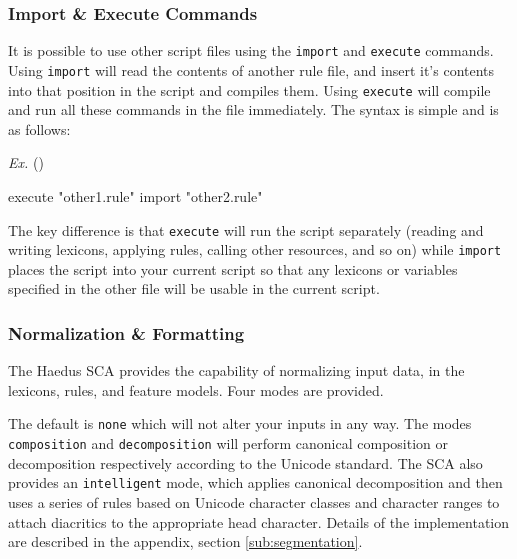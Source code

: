 \documentclass[10pt,letterpaper]{article}
\newcounter{excounter}
\newenvironment{vex}[1]{
	\refstepcounter{excounter}
	\noindent\emph{Ex.} (\arabic{excounter}\label{#1})
	\verbatim
}{\endverbatim}
\begin{document}

\subsubsection{Import \& Execute Commands}
\label{sub:import_and_execute_commands}
It is possible to use other script files using the \texttt{import} and \texttt{execute} commands. Using \texttt{import} will read the contents of another rule file, and insert it's contents into that position in the script and compiles them. Using \texttt{execute} will compile and run all these commands in the file immediately. The syntax is simple and is as follows:

\begin{vex}{ex:commands}
execute "other1.rule"
import  "other2.rule"
\end{vex}

\noindent
The key difference is that \texttt{execute} will run the script separately (reading and writing lexicons, applying rules, calling other resources, and so on) while \texttt{import} places the script into your current script so that any lexicons or variables specified in the other file will be usable in the current script.


\subsubsection{Normalization \& Formatting}
\label{sub:normalization_and_formatting}
The Haedus SCA provides the capability of normalizing input data, in the lexicons, rules, and feature models. Four modes are provided.

The default is \texttt{none} which will not alter your inputs in any way. The modes \texttt{composition} and \texttt{decomposition} will perform canonical composition or decomposition respectively according to the Unicode standard.
The SCA also provides an \texttt{intelligent} mode, which applies canonical decomposition and then uses a series of rules based on Unicode character classes and character ranges to attach diacritics to the appropriate head character. Details of the implementation are described in the appendix, section \ref{sub:segmentation}.
\end{document}
